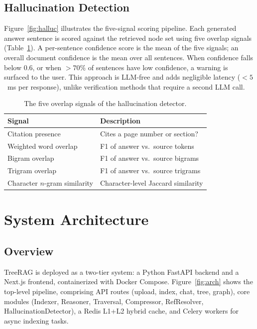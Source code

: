 \documentclass[sigconf,review,anonymous]{acmart}
\begin{document}
\subsection{Hallucination Detection}
\label{sec:halluc}
Figure~\ref{fig:halluc} illustrates the five-signal scoring pipeline. Each
generated answer sentence is scored against the retrieved node set using five
overlap signals (Table~\ref{tab:signals}). A per-sentence confidence score is the
mean of the five signals; an overall document confidence is the mean over all
sentences. When confidence falls below 0.6, or when $>70\%$ of sentences have low
confidence, a warning is surfaced to the user. This approach is LLM-free and adds
negligible latency ($<5$~ms per response), unlike verification methods that
require a second LLM call.

\begin{table}[t]
\caption{The five overlap signals of the hallucination detector.}
\label{tab:signals}
\begin{tabular}{ll}
\toprule
Signal & Description \\
\midrule
Citation presence & Cites a page number or section? \\
Weighted word overlap & F1 of answer vs.\ source tokens \\
Bigram overlap & F1 of answer vs.\ source bigrams \\
Trigram overlap & F1 of answer vs.\ source trigrams \\
Character $n$-gram similarity & Character-level Jaccard similarity \\
\bottomrule
\end{tabular}
\end{table}

\section{System Architecture}
\label{sec:system}

\subsection{Overview}
TreeRAG is deployed as a two-tier system: a Python FastAPI backend and a Next.js
frontend, containerized with Docker Compose. Figure~\ref{fig:arch} shows the
top-level pipeline, comprising API routes (upload, index, chat, tree, graph),
core modules (Indexer, Reasoner, Traversal, Compressor, RefResolver,
HallucinationDetector), a Redis L1+L2 hybrid cache, and Celery workers for async
indexing tasks.
\end{document}
